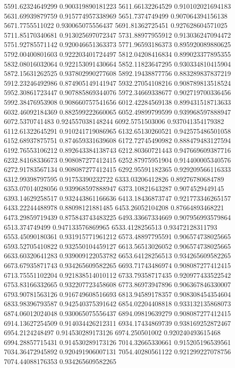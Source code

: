 {5591.62324649299 0.900319890181223
5611.66132264529 0.910102021694183
5631.69939879759 0.915774957338969
5651.7374749499 0.907064394156138
5671.7755511022 0.930065075556437
5691.81362725451 0.927628604571025
5711.85170340681 0.913025697072347
5731.88977955912 0.913036247094472
5751.92785571142 0.920046651363373
5771.96593186373 0.895920089880625
5792.00400801603 0.922203401724497
5812.04208416834 0.899023377895355
5832.08016032064 0.922153091430664
5852.11823647295 0.930334810415904
5872.15631262525 0.937802990277608
5892.19438877756 0.883289837837219
5912.23246492986 0.874905149141947
5932.27054108216 0.908789813518524
5952.30861723447 0.907885869344076
5972.34669338677 0.902719700336456
5992.38476953908 0.908660757541656
6012.42284569138 0.899431518713633
6032.46092184369 0.882599222660065
6052.49899799599 0.939968597888947
6072.5370741483 0.924557038148244
6092.5751503006 0.937041354179382
6112.61322645291 0.910241719086965
6132.65130260521 0.942575486501058
6152.68937875751 0.874659331639608
6172.72745490982 0.888479483127594
6192.76553106212 0.892643384138743
6212.80360721443 0.947669609387716
6232.84168336673 0.908087277412415
6252.87975951904 0.914400005340576
6272.91783567134 0.908087277412415
6292.95591182365 0.929209566116333
6312.99398797595 0.91753390232722
6333.03206412826 0.89276780684789
6353.07014028056 0.939968597888947
6373.10821643287 0.9074529449145
6393.14629258517 0.932443861166636
6413.18436873747 0.921773346265157
6433.22244488978 0.88098121881485
6453.26052104208 0.87664893468221
6473.29859719439 0.875843743483225
6493.33667334669 0.907956993579864
6513.374749499 0.947133576869965
6533.4128256513 0.93472128311793
6553.45090180361 0.931915771961212
6573.48897795591 0.906574738025665
6593.52705410822 0.932550104459127
6613.56513026052 0.906574738025665
6633.60320641283 0.939009122053782
6653.64128256513 0.934265609582265
6673.67935871743 0.934265609582265
6693.71743486974 0.908087277412415
6713.75551102204 0.921838514010112
6733.79358717435 0.920977433522542
6753.83166332665 0.932207723458608
6773.86973947896 0.906367846330007
6793.90781563126 0.916749608516693
6813.94589178357 0.908308454354604
6833.98396793587 0.942540375391642
6854.02204408818 0.933132135868073
6874.06012024048 0.930065075556437
6894.09819639279 0.908087277412415
6914.13627254509 0.914034426212311
6934.17434869739 0.938169252872467
6954.2124248497 0.914530289173126
6974.250501002 0.920240493615468
6994.28857715431 0.914530289173126
7014.32665330661 0.915205196539561
7034.36472945892 0.920491906007131
7054.40280561122 0.921299227078756
7074.44088176353 0.934265609582265
}
